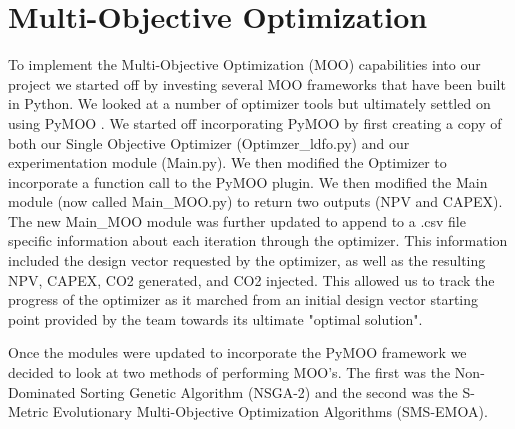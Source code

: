 \documentclass[balance,upint,subscriptcorrection,varvw,mathalfa=cal=boondoxo,spanish,french,vietnamese,russian,greek,pdf-a,colorlinks]{asmeconf}
\begin{document}
\begin{table}[!btp]
\caption[Table]{PSO Tuning}\label{PSO_tuning:1}
\end{table}

 


\section{Multi-Objective Optimization}
To implement the Multi-Objective Optimization (MOO) capabilities into our project we started off by investing several MOO frameworks that have been built in Python. We looked at a number of optimizer tools but ultimately settled on using PyMOO \cite{Blank2020}. We started off incorporating PyMOO by first creating a copy of both our Single Objective Optimizer (Optimzer_ldfo.py) and our experimentation module (Main.py). We then modified the Optimizer to incorporate a function call to the PyMOO plugin. We then modified the Main module (now called Main_MOO.py) to return two outputs (NPV and CAPEX). The new Main_MOO module was further updated to append to a .csv file specific information about each iteration through the optimizer. This information included the design vector requested by the optimizer, as well as the resulting NPV, CAPEX, CO2 generated, and CO2 injected. This allowed us to track the progress of the optimizer as it marched from an initial design vector starting point provided by the team towards its ultimate "optimal solution". 

Once the modules were updated to incorporate the PyMOO framework we decided to look at two methods of performing MOO's. The first was the Non-Dominated Sorting Genetic Algorithm (NSGA-2) and the second was the S-Metric Evolutionary Multi-Objective Optimization Algorithms (SMS-EMOA). 
\end{document}
